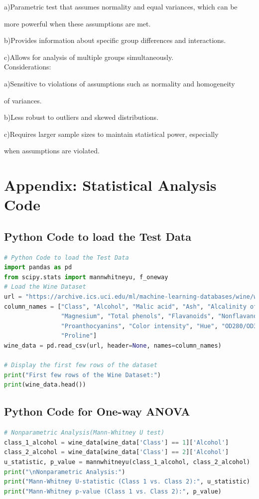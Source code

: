 \documentclass{article}
\begin{document}
a)Parametric test that assumes normality and equal variances, which can be 

more powerful when these assumptions are met.

b)Provides information about specific group differences and interactions.

c)Allows for analysis of multiple groups simultaneously.
\\Considerations:

a)Sensitive to violations of assumptions such as normality and homogeneity

of variances.

b)Less robust to outliers and skewed distributions.

c)Requires larger sample sizes to maintain statistical power, especially

when assumptions are violated.

\newpage
\appendix
\section{Appendix: Statistical Analysis Code}
\subsection{Python Code to load the Test Data}
\begin{lstlisting}[language=Python]
# Python Code to load the Test Data
import pandas as pd
from scipy.stats import mannwhitneyu, f_oneway
# Load the Wine Dataset
url = "https://archive.ics.uci.edu/ml/machine-learning-databases/wine/wine.data"
column_names = ["Class", "Alcohol", "Malic acid", "Ash", "Alcalinity of ash", 
                "Magnesium", "Total phenols", "Flavanoids", "Nonflavanoid phenols", 
                "Proanthocyanins", "Color intensity", "Hue", "OD280/OD315 of diluted wines", 
                "Proline"]
wine_data = pd.read_csv(url, header=None, names=column_names)

# Display the first few rows of the dataset
print("First few rows of the Wine Dataset:")
print(wine_data.head())
\end{lstlisting}
\subsection{Python Code for One-way ANOVA}
\begin{lstlisting}[language=Python]
# Nonparametric Analysis(Mann-Whitney U test)
class_1_alcohol = wine_data[wine_data['Class'] == 1]['Alcohol']
class_2_alcohol = wine_data[wine_data['Class'] == 2]['Alcohol']
u_statistic, p_value = mannwhitneyu(class_1_alcohol, class_2_alcohol)
print("\nNonparametric Analysis:")
print("Mann-Whitney U-statistic (Class 1 vs. Class 2):", u_statistic)
print("Mann-Whitney p-value (Class 1 vs. Class 2):", p_value)
\end{lstlisting}
\end{document}
